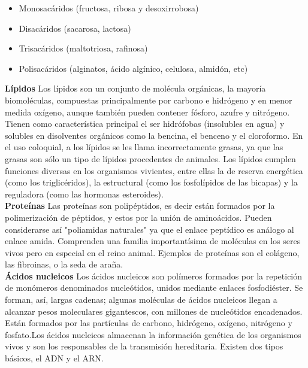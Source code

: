 \documentclass[12pt,letterpaper]{article}
\begin{document}
\begin{itemize}
	\item Monosacáridos (fructosa, ribosa y desoxirrobosa)
	\item Disacáridos (sacarosa, lactosa)
	\item Trisacáridos (maltotriosa, rafinosa)
	\item Polisacáridos (alginatos, ácido algínico, celulosa, almidón, etc)
	
\end{itemize}

\noindent \textbf{Lípidos} \quad Los lípidos son un conjunto de molécula orgánicas, la mayoría biomoléculas, compuestas principalmente por carbono e hidrógeno y en menor medida oxígeno, aunque también pueden contener fósforo, azufre y nitrógeno. Tienen como característica principal el ser hidrófobas (insolubles en agua) y solubles en disolventes orgánicos como la bencina, el benceno y el cloroformo. En el uso coloquial, a los lípidos se les llama incorrectamente grasas, ya que las grasas son sólo un tipo de lípidos procedentes de animales. Los lípidos cumplen funciones diversas en los organismos vivientes, entre ellas la de reserva energética (como los triglicéridos), la estructural (como los fosfolípidos de las bicapas) y la reguladora (como las hormonas esteroides).
\\

\noindent \textbf{Proteínas} \quad Las proteínas son polipéptidos, es decir están formados por la polimerización de péptidos, y estos por la unión de aminoácidos. Pueden considerarse así "poliamidas naturales" ya que el enlace peptídico es análogo al enlace amida. Comprenden una familia importantísima de moléculas en los seres vivos pero en especial en el reino animal. Ejemplos de proteínas son el colágeno, las fibroinas, o la seda de araña.
\\

\noindent \textbf{Ácidos nucleicos} \quad Los ácidos nucleicos son polímeros formados por la repetición de monómeros denominados nucleótidos, unidos mediante enlaces fosfodiéster. Se forman, así, largas cadenas; algunas moléculas de ácidos nucleicos llegan a alcanzar pesos moleculares gigantescos, con millones de nucleótidos encadenados. Están formados por las partículas de carbono, hidrógeno, oxígeno, nitrógeno y fosfato.Los ácidos nucleicos almacenan la información genética de los organismos vivos y son los responsables de la transmisión hereditaria. Existen dos tipos básicos, el ADN y el ARN.
\end{document}
